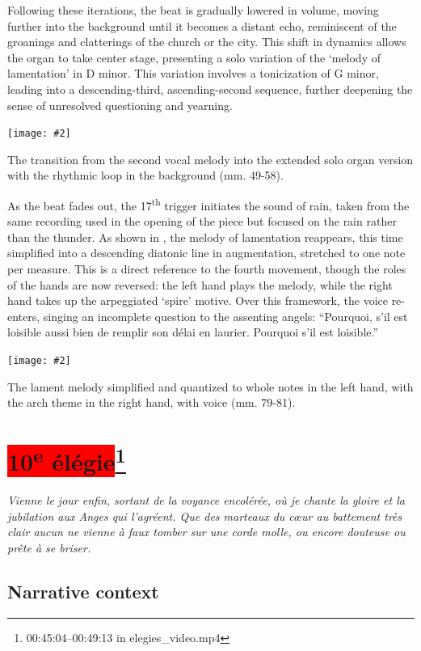 \documentclass[12pt,twoside,maitrise]{dms_ks}
\newcommand{\customincludeexamples}[4][]{%
    \begin{example}[H]
        \centering
        \texttt{[image: \#2]}
        \caption{#4}
	\label{#3} 
    \end{example}
}
\theoremstyle{definition}
\begin{document}
{{Following these iterations, the beat is gradually lowered in volume, moving further into the background until it becomes a distant echo, reminiscent of the groanings and clatterings of the church or the city. 
This shift in dynamics allows the organ to take center stage, presenting a solo variation of the `melody of lamentation' in D minor. 
This variation involves a tonicization of G minor, leading into a descending-third, ascending-second sequence, further deepening the sense of unresolved questioning and yearning.

\customincludeexamples[width=\textwidth]{9e_2}{ex:9e_2}{The transition from the second vocal melody into the extended solo organ version with the rhythmic loop in the background (mm. 49-58).}

As the beat fades out, the 17\textsuperscript{th} trigger initiates the sound of rain, taken from the same recording used in the opening of the piece but focused on the rain rather than the thunder. 
As shown in , the melody of lamentation reappears, this time simplified into a descending diatonic line in augmentation, stretched to one note per measure. 
This is a direct reference to the fourth movement, though the roles of the hands are now reversed: the left hand plays the melody, while the right hand takes up the arpeggiated `spire' motive. 
Over this framework, the voice re-enters, singing an incomplete question to the assenting angels: “Pourquoi, s'il est loisible aussi bien de remplir son délai en laurier. Pourquoi s'il est loisible.”

\customincludeexamples[width=\textwidth]{9e_3}{ex:9e_3}{The lament melody simplified and quantized to whole notes in the left hand, with the arch theme in the right hand, with voice (mm. 79-81).}

\section{\colorbox{red}{10\textsuperscript{e} élégie}\footnote{00:45:04--00:49:13 in elegies\_video.mp4}}

\epigraph{\textit{Vienne le jour enfin, sortant de la voyance encolérée, où je chante la gloire et la jubilation aux Anges qui l’agréent. Que des marteaux du cœur au battement très clair aucun ne vienne à faux tomber sur une corde molle, ou encore douteuse ou prête à se briser.}}{}

\subsection{Narrative context}

}}
\end{document}
